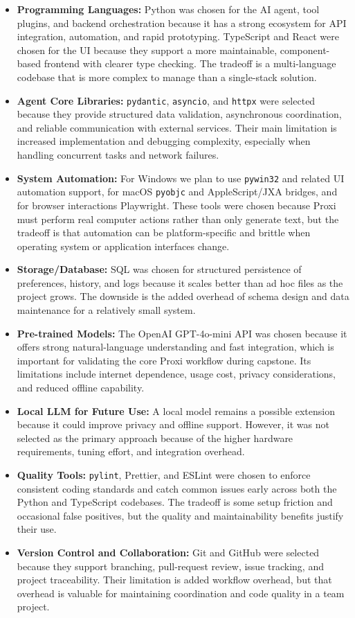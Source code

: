 \documentclass{article}
\begin{document}
\begin{itemize}
  \item \textbf{Programming Languages:} Python was chosen for the AI agent,
  tool plugins, and backend orchestration because it has a strong
  ecosystem for API integration, automation, and rapid prototyping.
  TypeScript and React were chosen for the UI because they support a more
  maintainable, component-based frontend with clearer type checking. The
  tradeoff is a multi-language codebase that is more complex to manage
  than a single-stack solution.
  \item \textbf{Agent Core Libraries:} \texttt{pydantic}, \texttt{asyncio},
  and \texttt{httpx} were selected because they provide structured data
  validation, asynchronous coordination, and reliable communication with
  external services. Their main limitation is increased implementation and
  debugging complexity, especially when handling concurrent tasks and
  network failures.
  \item \textbf{System Automation:} For Windows we plan to use
  \texttt{pywin32} and related UI automation support, for macOS
  \texttt{pyobjc} and AppleScript/JXA bridges, and for browser
  interactions Playwright. These tools were chosen because Proxi must
  perform real computer actions rather than only generate text, but the
  tradeoff is that automation can be platform-specific and brittle when
  operating system or application interfaces change.
  \item \textbf{Storage/Database:} SQL was chosen for structured
  persistence of preferences, history, and logs because it scales better
  than ad hoc files as the project grows. The downside is the added
  overhead of schema design and data maintenance for a relatively small
  system.
  \item \textbf{Pre-trained Models:} The OpenAI GPT-4o-mini API was chosen
  because it offers strong natural-language understanding and fast
  integration, which is important for validating the core Proxi workflow
  during capstone. Its limitations include internet dependence, usage
  cost, privacy considerations, and reduced offline capability.
  \item \textbf{Local LLM for Future Use:} A local model remains a possible
  extension because it could improve privacy and offline support.
  However, it was not selected as the primary approach because of the
  higher hardware requirements, tuning effort, and integration overhead.
  \item \textbf{Quality Tools:} \texttt{pylint}, Prettier, and ESLint were
  chosen to enforce consistent coding standards and catch common issues
  early across both the Python and TypeScript codebases. The tradeoff is
  some setup friction and occasional false positives, but the quality and
  maintainability benefits justify their use.
  \item \textbf{Version Control and Collaboration:} Git and GitHub were
  selected because they support branching, pull-request review, issue
  tracking, and project traceability. Their limitation is added workflow
  overhead, but that overhead is valuable for maintaining coordination
  and code quality in a team project.
\end{itemize}
\end{document}
